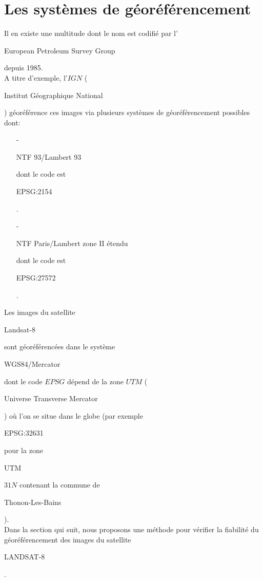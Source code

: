 \documentclass{book}
\begin{document}
\section{Les systèmes de géoréférencement}

Il en existe une multitude dont le nom est codifié par l'\begin{itshape}European Petroleum Survey Group\end{itshape} depuis 1985.\\
A titre d'exemple, l'$IGN$ (\begin{itshape}Institut Géographique National\end{itshape}) géoréférence ces images via plusieurs
systèmes de géoréférencement possibles dont:\\

\begin{itemize}

\item[-] \begin{itshape}NTF 93/Lambert 93\end{itshape} dont le code est \begin{itshape}EPSG:2154\end{itshape}.\\
\item[-] \begin{itshape}NTF Paris/Lambert zone II étendu\end{itshape} dont le code est \begin{itshape}EPSG:27572\end{itshape}.\\
 
\end{itemize}

Les images du satellite \begin{itshape}Landsat-8\end{itshape} sont géoréférencées dans le système 
\begin{itshape}WGS84/Mercator\end{itshape} dont le code $EPSG$ dépend
de la zone $UTM$ (\begin{itshape}Universe Transverse Mercator\end{itshape}) où l'on se situe dans le globe 
(par exemple \begin{itshape}EPSG:32631\end{itshape} pour la zone \begin{itshape}UTM\end{itshape} $31N$ contenant la commune de
 \begin{itshape}Thonon-Les-Bains\end{itshape}).\\ 
Dans la section qui suit, nous proposons une méthode pour vérifier la fiabilité du géoréférencement
 des images du satellite \begin{itshape}LANDSAT-8\end{itshape}.
 
\end{document}
